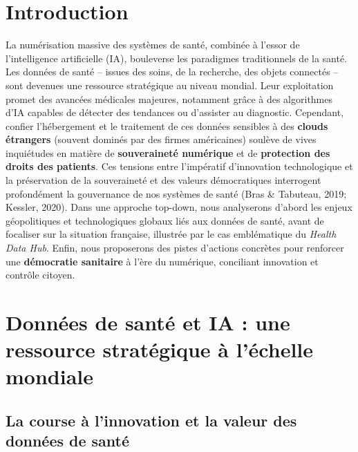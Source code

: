 \documentclass[10pt,a4paper]{article} %
\begin{document}
\newpage
\renewcommand*\contentsname{Table of Contents} %
{
\hypersetup{linkcolor=}
\setcounter{tocdepth}{5} %
\tableofcontents
}
\newpage
{} %


\section{Introduction}

La numérisation massive des systèmes de santé, combinée à l’essor de l’intelligence artificielle (IA), bouleverse les paradigmes traditionnels de la santé. Les données de santé – issues des soins, de la recherche, des objets connectés – sont devenues une ressource stratégique au niveau mondial. Leur exploitation promet des avancées médicales majeures, notamment grâce à des algorithmes d’IA capables de détecter des tendances ou d’assister au diagnostic. Cependant, confier l’hébergement et le traitement de ces données sensibles à des \textbf{clouds étrangers} (souvent dominés par des firmes américaines) soulève de vives inquiétudes en matière de \textbf{souveraineté numérique} et de \textbf{protection des droits des patients}. Ces tensions entre l’impératif d’innovation technologique et la préservation de la souveraineté et des valeurs démocratiques interrogent profondément la gouvernance de nos systèmes de santé (Bras \& Tabuteau, 2019; Kessler, 2020). Dans une approche top-down, nous analyserons d’abord les enjeux géopolitiques et technologiques globaux liés aux données de santé, avant de focaliser sur la situation française, illustrée par le cas emblématique du \textit{Health Data Hub}. Enfin, nous proposerons des pistes d’actions concrètes pour renforcer une \textbf{démocratie sanitaire} à l’ère du numérique, conciliant innovation et contrôle citoyen.

\section{Données de santé et IA : une ressource stratégique à l’échelle mondiale}

\subsection{La course à l’innovation et la valeur des données de santé}
\end{document}

